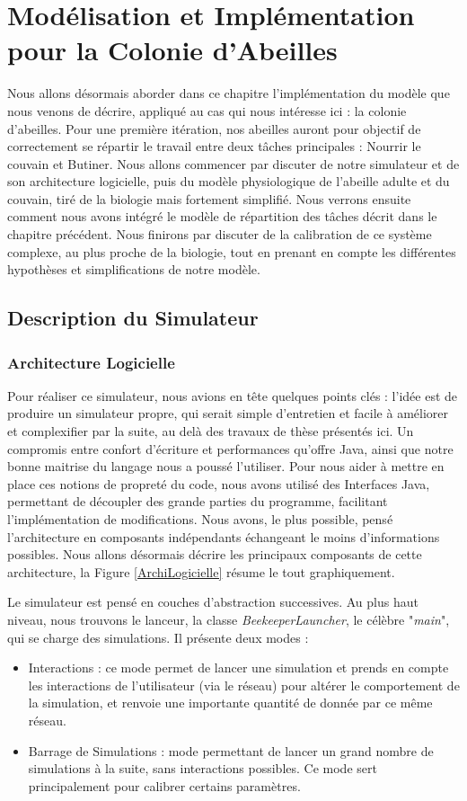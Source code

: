 \chapter{Modélisation et Implémentation pour la Colonie d'Abeilles}

	Nous allons désormais aborder dans ce chapitre l'implémentation du modèle que nous venons de décrire, appliqué au cas qui nous intéresse ici : la colonie d'abeilles. Pour une première itération, nos abeilles auront pour objectif de correctement se répartir le travail entre deux tâches principales : Nourrir le couvain et Butiner. Nous allons commencer par discuter de notre simulateur et de son architecture logicielle, puis du modèle physiologique de l'abeille adulte et du couvain, tiré de la biologie mais fortement simplifié. Nous verrons ensuite comment nous avons intégré le modèle de répartition des tâches décrit dans le chapitre précédent. Nous finirons par discuter de la calibration de ce système complexe, au plus proche de la biologie, tout en prenant en compte les différentes hypothèses et simplifications de notre modèle.
	
	\section{Description du Simulateur}
		\subsection{Architecture Logicielle}
			Pour réaliser ce simulateur, nous avions en tête quelques points clés : l'idée est de produire un simulateur propre, qui serait simple d'entretien et facile à améliorer et complexifier par la suite, au delà des travaux de thèse présentés ici. Un compromis entre confort d'écriture et performances qu'offre Java, ainsi que notre bonne maitrise du langage nous a poussé l'utiliser. Pour nous aider à mettre en place ces notions de propreté du code, nous avons utilisé des Interfaces Java, permettant de découpler des grande parties du programme, facilitant l'implémentation de modifications. Nous avons, le plus possible, pensé l'architecture en composants indépendants échangeant le moins d'informations possibles. Nous allons désormais décrire les principaux composants de cette architecture, la Figure \ref{ArchiLogicielle} résume le tout graphiquement.
			
			Le simulateur est pensé en couches d'abstraction successives. Au plus haut niveau, nous trouvons le lanceur, la classe \textit{BeekeeperLauncher}, le célèbre "\textit{main}", qui se charge des simulations. Il présente deux modes :
	\begin{itemize}
		\item Interactions : ce mode permet de lancer une simulation et prends en compte les interactions de l'utilisateur (via le réseau) pour altérer le comportement de la simulation, et renvoie une importante quantité de donnée par ce même réseau.
		\item Barrage de Simulations : mode permettant de lancer un grand nombre de simulations à la suite, sans interactions possibles. Ce mode sert principalement pour calibrer certains paramètres.
	\end{itemize}				
			
